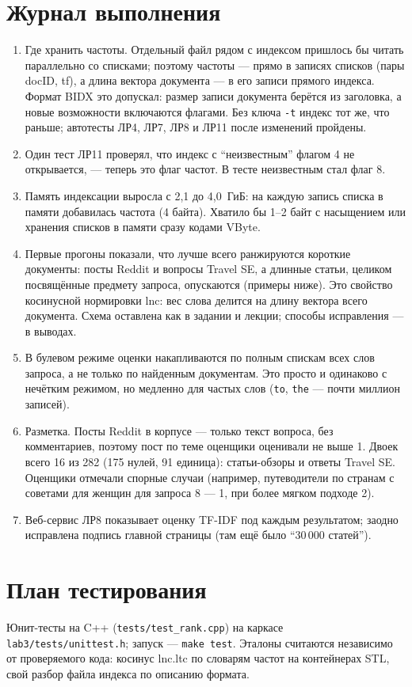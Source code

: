 \section{Журнал выполнения}
\begin{enumerate}
    \item Где хранить частоты. Отдельный файл рядом с индексом пришлось бы читать параллельно со списками; поэтому частоты --- прямо в записях списков (пары docID, tf), а длина вектора документа --- в его записи прямого индекса. Формат BIDX это допускал: размер записи документа берётся из заголовка, а новые возможности включаются флагами. Без ключа \texttt{-t} индекс тот же, что раньше; автотесты ЛР4, ЛР7, ЛР8 и ЛР11 после изменений пройдены.
    \item Один тест ЛР11 проверял, что индекс с \enquote{неизвестным} флагом 4 не открывается, --- теперь это флаг частот. В тесте неизвестным стал флаг 8.
    \item Память индексации выросла с 2,1 до 4,0~ГиБ: на каждую запись списка в памяти добавилась частота (4 байта). Хватило бы 1--2 байт с насыщением или хранения списков в памяти сразу кодами VByte.
    \item Первые прогоны показали, что лучше всего ранжируются короткие документы: посты Reddit и вопросы Travel SE, а длинные статьи, целиком посвящённые предмету запроса, опускаются (примеры ниже). Это свойство косинусной нормировки lnc: вес слова делится на длину вектора всего документа. Схема оставлена как в задании и лекции; способы исправления --- в выводах.
    \item В булевом режиме оценки накапливаются по полным спискам всех слов запроса, а не только по найденным документам. Это просто и одинаково с нечётким режимом, но медленно для частых слов (\texttt{to}, \texttt{the} --- почти миллион записей).
    \item Разметка. Посты Reddit в корпусе --- только текст вопроса, без комментариев, поэтому пост по теме оценщики оценивали не выше 1. Двоек всего 16 из 282 (175 нулей, 91 единица): статьи-обзоры и ответы Travel SE. Оценщики отмечали спорные случаи (например, путеводители по странам с советами для женщин для запроса 8 --- 1, при более мягком подходе 2).
    \item Веб-сервис ЛР8 показывает оценку TF-IDF под каждым результатом; заодно исправлена подпись главной страницы (там ещё было \enquote{30\,000 статей}).
\end{enumerate}

\section{План тестирования}
Юнит-тесты на C++ (\texttt{tests/test\_rank.cpp}) на каркасе \texttt{lab3/tests/unittest.h}; запуск --- \texttt{make test}. Эталоны считаются независимо от проверяемого кода: косинус lnc.ltc по словарям частот на контейнерах STL, свой разбор файла индекса по описанию формата.

